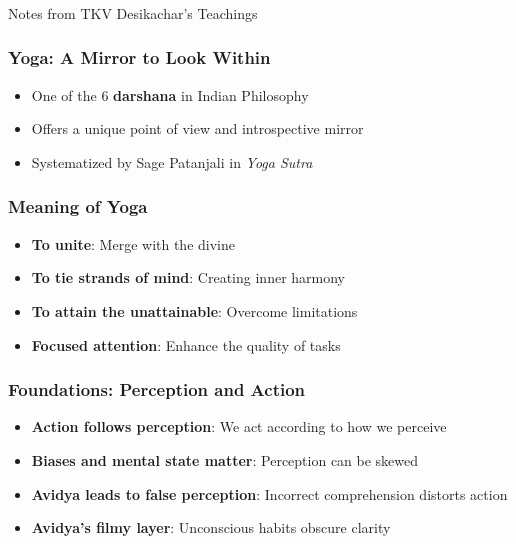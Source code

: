 \begin{frame}[fragile]\frametitle{}
\begin{center}
{\Large Notes from TKV Desikachar's Teachings}
\end{center}
\end{frame}

\begin{frame}[fragile]\frametitle{Yoga: A Mirror to Look Within}
  \begin{itemize}
    \item One of the 6 \textbf{darshana} in Indian Philosophy
    \item Offers a unique point of view and introspective mirror
    \item Systematized by Sage Patanjali in \textit{Yoga Sutra}
  \end{itemize}
\end{frame}

\begin{frame}[fragile]\frametitle{Meaning of Yoga}
  \begin{itemize}
    \item \textbf{To unite}: Merge with the divine
    \item \textbf{To tie strands of mind}: Creating inner harmony
    \item \textbf{To attain the unattainable}: Overcome limitations
    \item \textbf{Focused attention}: Enhance the quality of tasks
  \end{itemize}
\end{frame}

\begin{frame}[fragile]\frametitle{Foundations: Perception and Action}
  \begin{itemize}
    \item \textbf{Action follows perception}: We act according to how we perceive
    \item \textbf{Biases and mental state matter}: Perception can be skewed
    \item \textbf{Avidya leads to false perception}: Incorrect comprehension distorts action
    \item \textbf{Avidya's filmy layer}: Unconscious habits obscure clarity
  \end{itemize}
\end{frame}

